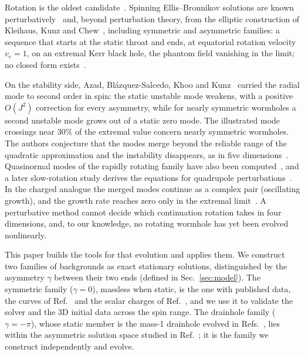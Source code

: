 \documentclass[twocolumn,floatfix,aps,prd,superscriptaddress,nofootinbib]{revtex4-2}
\begin{document}
Rotation is the oldest candidate~\cite{matos2006}. Spinning Ellis--Bronnikov solutions are known perturbatively~\cite{kashargin2008} and, beyond perturbation theory, from the elliptic construction of Kleihaus, Kunz and Chew~\cite{kleihaus_kunz2014,chew2016}, including symmetric and asymmetric families: a sequence that starts at the static throat and ends, at equatorial rotation velocity $v_e=1$, on an extremal Kerr black hole, the phantom field vanishing in the limit; no closed form exists~\cite{volkov2021}.

On the stability side, Azad, Bl\'azquez-Salcedo, Khoo and Kunz~\cite{azad2023,azad2024} carried the radial mode to second order in spin: the static unstable mode weakens, with a positive $O(J^2)$ correction for every asymmetry, while for nearly symmetric wormholes a second unstable mode grows out of a static zero mode. The illustrated mode crossings near $30\%$ of the extremal value concern nearly symmetric wormholes. The authors conjecture that the modes merge beyond the reliable range of the quadratic approximation and the instability disappears, as in five dimensions~\cite{dzhunushaliev2013}. Quasinormal modes of the rapidly rotating family have also been computed~\cite{khoo2024}, and a later slow-rotation study derives the equations for quadrupole perturbations~\cite{azad2025quad}. In the charged analogue the merged modes continue as a complex pair (oscillating growth), and the growth rate reaches zero only in the extremal limit~\cite{blazquez2025}. A perturbative method cannot decide which continuation rotation takes in four dimensions, and, to our knowledge, no rotating wormhole has yet been evolved nonlinearly.

This paper builds the tools for that evolution and applies them. We construct two families of backgrounds as exact stationary solutions, distinguished by the asymmetry $\gamma$ between their two ends (defined in Sec.~\ref{sec:model}). The symmetric family ($\gamma=0$), massless when static, is the one with published data, the curves of Ref.~\cite{kleihaus_kunz2014} and the scalar charges of Ref.~\cite{chew2016}, and we use it to validate the solver and the 3D initial data across the spin range. The drainhole family ($\gamma=-\pi$), whose static member is the mass-1 drainhole evolved in Refs.~\cite{shirokov2026,shirokov2026c}, lies within the asymmetric solution space studied in Ref.~\cite{chew2016}; it is the family we construct independently and evolve.
\end{document}
